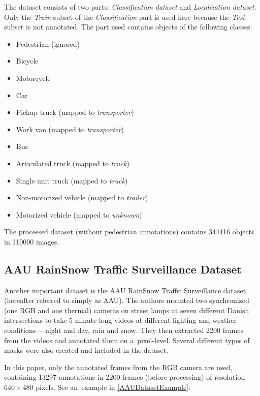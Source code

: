 The dataset consists of two parts: \textit{Classification dataset} and
\textit{Localization dataset}. Only the \textit{Train} subset of the
\textit{Classification} part is used here because the \textit{Test} subset is
not annotated. The part used contains objects of the following classes:
\begin{itemize}
    \item Pedestrian (ignored)
    \item Bicycle
    \item Motorcycle
    \item Car
    \item Pickup truck (mapped to \textit{transporter})
    \item Work van (mapped to \textit{transporter})
    \item Bus
    \item Articulated truck (mapped to \textit{truck})
    \item Single unit truck (mapped to \textit{truck})
    \item Non-motorized vehicle (mapped to \textit{trailer})
    \item Motorized vehicle (mapped to \textit{unknown})
\end{itemize}
The processed dataset (without pedestrian annotations) contains \num{344416}
objects in \num{110000} images.



\subsection{AAU RainSnow Traffic Surveillance Dataset}
\label{AAUDataset}

Another important dataset is the AAU RainSnow Traffic Surveillance
dataset~\cite{Bahnsen2019} (hereafter referred to simply as AAU). The authors
mounted two synchronized (one RGB and one thermal) cameras on street lamps at
seven different Danish intersections to take 5-minute long videos at different
lighting and weather conditions\,---\,night and day, rain and snow. They then
extracted \num{2200} frames from the videos and annotated them on a~pixel-level.
Several different types of masks were also created and included in the dataset.

In this paper, only the annotated frames from the RGB camera are used,
containing \num{13297} annotations in \num{2200} frames (before processing) of
resolution $640 \times 480$ pixels. See an~example in
\autoref{AAUDatasetExample}.

